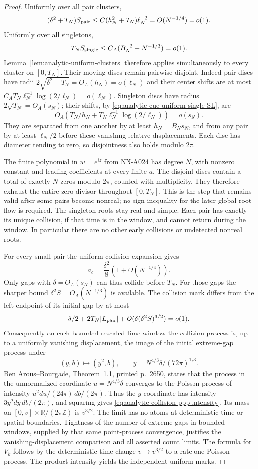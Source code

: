 \begin{proof}
Uniformly over all pair clusters,
\[
 (\delta^2+T_N)S_{\rm pair}
       \le C(h_N^2+T_N)\ell_N^{-2}=O(N^{-1/4})=o(1).
\]
Uniformly over all singletons,
\[
 T_NS_{\rm single}
       \le C_A(B_N^{-2}+N^{-1/3})=o(1).
\]
Lemma~\ref{lem:analytic-uniform-clusters} therefore applies
simultaneously to every cluster on $[0,T_N]$. Their moving
discs remain pairwise disjoint. Indeed pair discs have radii
$2\sqrt{\delta^2+T_N}=O_A(h_N)=o(\ell_N)$ and their center
shifts are at most $C_AT_N\ell_N^{-1}\log(2/\ell_N)
=o(\ell_N)$. Singleton discs have radius $2\sqrt{T_N}=O_A(s_N)$;
their shifts, by \eqref{eq:analytic-cue-uniform-single-SL}, are
\[
 O_A(T_N/h_N+T_N\ell_N^{-1}\log(2/\ell_N))=o(s_N).
\]
They are separated from one another by at least $h_N=B_Ns_N$,
and from any pair by at least $\ell_N/2$ before these vanishing
relative displacements. Each disc has diameter tending to zero,
so disjointness also holds modulo $2\pi$.

The finite polynomial in $w=e^{iz}$ from NN-A024 has degree
$N$, with nonzero constant and leading coefficients at every
finite $a$. The disjoint discs contain a total of exactly $N$
zeros modulo $2\pi$, counted with multiplicity. They therefore
exhaust the entire zero divisor throughout $[0,T_N]$. This is
the step that remains valid after some pairs become nonreal;
no sign inequality for the later global root flow is required.
The singleton roots stay real and simple. Each pair has exactly
its unique collision, if that time is in the window, and cannot
return during the window. In particular there are no other
early collisions or undetected nonreal roots.

For every small pair the uniform collision expansion gives
\[
 a_c=\frac{\delta^2}{8}(1+O(N^{-1/4})).
\]
Only gaps with $\delta=O_A(s_N)$ can thus collide before $T_N$.
For those gaps the sharper bound $\delta^2S=O_A(N^{-1/3})$
is available. The collision mark differs from the left endpoint
of its initial gap by at most
\[
 \delta/2+2T_N|L_{\rm pair}|+O(\delta(\delta^2S)^{3/2})=o(1).
\]
Consequently on each bounded rescaled time window the collision
process is, up to a uniformly vanishing displacement, the image
of the initial extreme-gap process under
\[
                  (y,b)\longmapsto(y^2,b),\qquad
                  y=N^{4/3}\delta/(72\pi)^{1/3}.
\]
Ben Arous--Bourgade, Theorem~1.1, printed p.~2650, states
that the process in the unnormalized coordinate
$u=N^{4/3}\delta$ converges to the Poisson process of intensity
$u^2du/(24\pi)\,db/(2\pi)$. Thus the $y$ coordinate has
intensity $3y^2dy\,db/(2\pi)$, and squaring gives
\eqref{eq:analytic-collision-ppp-intensity}.
Its mass on $[0,v]\times\mathbb R/(2\pi\mathbb Z)$ is
$v^{3/2}$. The limit has no atoms at deterministic time or
spatial boundaries. Tightness of the number of extreme gaps
in bounded windows, supplied by that same point-process
convergence, justifies the vanishing-displacement comparison
and all asserted count limits. The formula for $V_k$ follows
by the deterministic time change $v\mapsto v^{3/2}$ to a
rate-one Poisson process. The product intensity yields the
independent uniform marks.
\end{proof}

